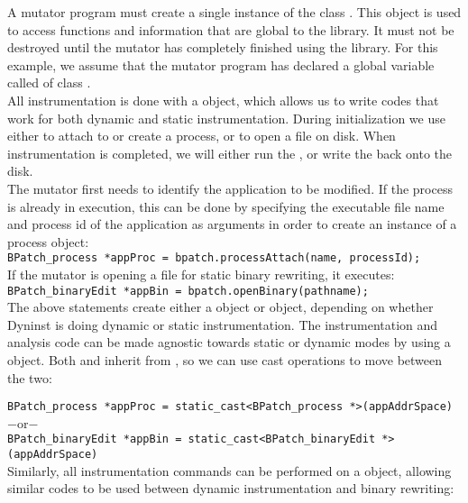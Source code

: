 A mutator program must create a single instance of the class \BPatch.  This object is used to access functions and information that are global to the library.  It must not be destroyed until the mutator has completely finished using the library.  For this example, we assume that the mutator program has declared a global variable called \bpatch of class \BPatch.\\
All instrumentation is done with a \BPatchaddressSpace object, which allows us to write codes that work for both dynamic and static instrumentation.  During initialization we use either \BPatchprocess to attach to or create a process, or \BPatchbinaryEdit to open a file on disk.  When instrumentation is completed, we will either run the \BPatchprocess, or write the \BPatchbinaryEdit back onto the disk.\\

The mutator first needs to identify the application to be modified.  If the process is already in execution, this can be done by specifying the executable file name and process id of the application as arguments in order to create an instance of a process object: \\

\texttt{BPatch\_process *appProc = bpatch.processAttach(name, processId);}\\

If the mutator is opening a file for static binary rewriting, it executes:\\

\texttt{BPatch\_binaryEdit *appBin = bpatch.openBinary(pathname);}\\

The above statements create either a \BPatchprocess object or \BPatchbinaryEdit object, depending on whether Dyninst is doing dynamic or static instrumentation.  The instrumentation and analysis code can be made agnostic towards static or dynamic modes by using a \BPatchaddressSpace object.  Both \BPatchprocess and \BPatchbinaryEdit inherit from \BPatchaddressSpace, so we can use cast operations to move between the two:

\texttt{BPatch\_process *appProc = static\_cast<BPatch\_process *>(appAddrSpace)}\\
$-$or$-$\\
\texttt{BPatch\_binaryEdit *appBin = static\_cast<BPatch\_binaryEdit *>(appAddrSpace)}\\

Similarly, all instrumentation commands can be performed on a \BPatchaddressSpace object, allowing similar codes to be used between dynamic instrumentation and binary rewriting:\\

